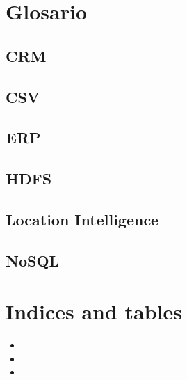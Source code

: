 \documentclass[letterpaper,10pt,spanish]{sphinxmanual}
\begin{document}
\chapter{Glosario}
\label{\detokenize{tfm/99-glosario::doc}}\label{\detokenize{tfm/99-glosario:glosario}}

\section{CRM}
\label{\detokenize{tfm/99-glosario:crm}}

\section{CSV}
\label{\detokenize{tfm/99-glosario:csv}}

\section{ERP}
\label{\detokenize{tfm/99-glosario:erp}}

\section{HDFS}
\label{\detokenize{tfm/99-glosario:hdfs}}

\section{Location Intelligence}
\label{\detokenize{tfm/99-glosario:location-intelligence}}\label{\detokenize{tfm/99-glosario:id1}}

\section{NoSQL}
\label{\detokenize{tfm/99-glosario:nosql}}

\chapter{Indices and tables}
\label{\detokenize{index:indices-and-tables}}\begin{itemize}
\item {} 

\item {} 

\item {} 

\end{itemize}



\renewcommand{\indexname}{Índice}
\printindex
\end{document}
